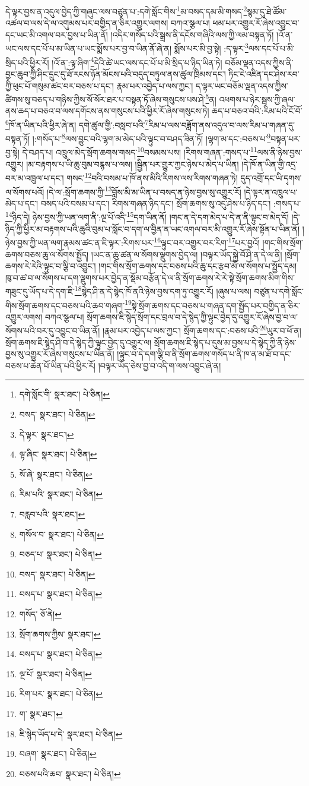 དེ་ལྟར་བྱས་ན་འདུལ་བྱེད་ཀྱི་གཞུང་ལས་བཙུན་པ་:དགེ་སློང་གིས་\footnote{དགེ་སློང་གི་  སྣར་ཐང་།  པེ་ཅིན། }མ་བསད་དམ་མི་གསད་\footnote{བསད་  སྣར་ཐང་།  པེ་ཅིན། }སྙམ་དུ་ཐེ་ཚོམ་འཚལ་བ་ལས་དེ་ལ་འགུམས་པར་བགྱིད་ན་ཅིར་འགྱུར་ལགས། བཀའ་སྩལ་པ། ཕམ་པར་འགྱུར་རོ་ཞེས་འབྱུང་བ་དང་ཡང་མི་འགལ་བར་བྱས་པ་ཡིན་ནོ། །འདིར་གསོད་པའི་སྒྲས་ནི་དངོས་གཞིའི་ལས་ཀྱི་ལམ་བསྟན་ཏོ། །འོ་ན་ཡང་ལས་དང་པོ་པ་མ་ཡིན་པ་ཡང་སྨོས་པར་བྱ་བ་ཡིན་ནོ་ཞེ་ན། སྨོས་པར་མི་བྱ་སྟེ། :ད་ལྟར་\footnote{དེ་ལྟར་  སྣར་ཐང་། }ལས་དང་པོ་པ་མི་སྲིད་པའི་ཕྱིར་རོ། །འོ་ན་:ལྟ་ཞིག་\footnote{ལྟ་ཞིང་  སྣར་ཐང་།  པེ་ཅིན། }དེའི་ཚེ་ཡང་ལས་དང་པོ་པ་མི་སྲིད་པ་ཉིད་ཡིན་ཏེ། བཅོམ་ལྡན་འདས་ཀྱིས་ནི་བྱང་ཆུབ་ཀྱི་ཤིང་དྲུང་དུ་ཐོ་རངས་ཉོན་མོངས་པའི་བདུད་བཏུལ་ནས་ཚུལ་ཁྲིམས་དང་། ཏིང་ངེ་འཛིན་དང་ཤེས་རབ་ཀྱི་ཕུང་པོ་གསུམ་ཚང་བར་བཅས་པ་དང་། རྣམ་པར་འབྱེད་པ་ལས་ཀྱང་། ད་ལྟར་ཡང་བཅོམ་ལྡན་འདས་ཀྱིས་ཚིགས་སུ་བཅད་པ་གཉིས་ཀྱིས་སོ་སོར་ཐར་པ་བསྟན་ཏོ་ཞེས་གསུངས་པས་ཤེ་\footnote{སོ་ཞེ་  སྣར་ཐང་།  པེ་ཅིན། }ན། འཕགས་པ་ཉེར་སྦས་ཀྱི་ཞལ་ནས་ཆད་པ་བཅའ་བ་ལས་དགོངས་ནས་གསུངས་པའི་ཕྱིར་རོ་ཞེས་གསུངས་ཏེ། ཆད་པ་བཅའ་བའི་:རིམ་པའི་ངོ་བོ་\footnote{རིམ་པའི་  སྣར་ཐང་།  པེ་ཅིན། }ཁོ་ན་ཡིན་པའི་ཕྱིར་ཞེ་ན། དགེ་ཚུལ་གྱི་:བསླབ་པའི་\footnote{བརླབ་པའི་  སྣར་ཐང་། }རིམ་པ་ལས་བཟློག་ནས་འདུལ་བ་ལས་རིམ་པ་གཞན་དུ་བསྟན་ཏོ། །:གསོད་པ་\footnote{གསོལ་བ་  སྣར་ཐང་།  པེ་ཅིན། }ལས་བྱུང་བའི་ལྷག་མ་མེད་པའི་ལྟུང་བ་བཤད་ཟིན་ཏོ། །ལྷག་མ་དང་:བཅས་པ་\footnote{བཅད་པ་  སྣར་ཐང་།  པེ་ཅིན། }བསྟན་པར་བྱ་སྟེ། དེ་བཤད་པ། འཁྲུལ་མེད་སྲོག་ཆགས་གསད་\footnote{བསད་  སྣར་ཐང་།  པེ་ཅིན། }བསམས་པས། །རིགས་གཞན་:གསད་པ་\footnote{བསད་པ་  སྣར་ཐང་།  པེ་ཅིན། }ལས་ནི་ཉེས་བྱས་འགྱུར། །མ་བརྟགས་པ་ཡི་ཆུ་བུམ་བརྙས་པ་ལས། །སྦྱིན་པར་གྱུར་ཀྱང་ཉེས་པ་མེད་པ་ཡིན། །དེ་ཁོ་ན་ཡིན་གྱི་འདྲ་བར་མ་འཁྲུལ་པ་དང་། གསང་\footnote{གསོད་  ཅོ་ནེ། }བའི་བསམ་པ་ཁོ་ནས་མིའི་རིགས་ལས་རིགས་གཞན་ཏེ། དུད་འགྲོ་དང་ཡི་དྭགས་ལ་སོགས་པའོ། །དེ་ལ་:སྲོག་ཆགས་ཀྱི་\footnote{སྲོག་ཆགས་ཀྱིས་  སྣར་ཐང་། }བློས་མི་མ་ཡིན་པ་བསད་ན་ཉེས་བྱས་སུ་འགྱུར་རོ། །དེ་ལྟར་ན་འཁྲུལ་པ་མེད་པ་དང་། བསད་པའི་བསམ་པ་དང་། རིགས་གཞན་ཉིད་དང་། སྲོག་ཆགས་སུ་འདུ་ཤེས་པ་ཉིད་དང་། :གསད་པ་\footnote{བསད་པ་  སྣར་ཐང་།  པེ་ཅིན། }ཉིད་དེ། ཉེས་བྱས་ཀྱི་ཡན་ལག་ནི་:ལྔ་པོ་འདི་\footnote{ལྔ་པོ་  སྣར་ཐང་།  པེ་ཅིན། }དག་ཡིན་ནོ། །གང་ན་དེ་དག་མེད་པ་དེ་ན་ནི་ལྟུང་བ་མེད་དོ། །དེ་ཉིད་ཀྱི་ཕྱིར་མ་བརྟགས་པའི་ཆུའི་བུམ་པ་སློང་བ་དག་ལ་བྱིན་ན་ཡང་འགལ་བར་མི་འགྱུར་རོ་ཞེས་སྟོན་པ་ཡིན་ནོ། །ཉེས་བྱས་ཀྱི་ཡན་ལག་རྣམས་ཚང་ན་ཇི་ལྟར་:རིགས་པར་\footnote{རིག་པར་  སྣར་ཐང་།  པེ་ཅིན། }ལྟུང་བར་འགྱུར་བར་རིག་\footnote{ག་  སྣར་ཐང་། }པར་བྱའོ། །གང་གིས་སྲོག་ཆགས་བཅས་ཆུ་ལ་སོགས་སྤྱོད། །ཡང་ན་ཆུ་ཚན་ལ་སོགས་ལྡུགས་བྱེད་ལ། །བལྟར་ཡོད་སྐྱེ་བོ་ཤི་ན་དེ་ལ་ནི། །སྲོག་ཆགས་རེ་རེའི་ལྟུང་བ་ལྕི་བ་འབྱུང་། །གང་གིས་སྲོག་ཆགས་དང་བཅས་པའི་ཆུ་དང་རྩབ་མོ་ལ་སོགས་པ་སྤྱོད་དམ། ཁུ་བ་ཚ་བ་ལ་སོགས་པ་དག་ལྡུགས་པར་བྱེད་ན་སྡོམ་བརྩོན་དེ་ལ་ནི་སྲོག་ཆགས་རེ་རེ་སྟེ་སྲོག་ཆགས་མིག་གིས་གཟུང་དུ་ཡོད་པ་དེ་དག་ཇི་\footnote{ཇི་སྙེད་ཡོད་པ་དེ་  སྣར་ཐང་།  པེ་ཅིན། }སྙེད་ཤི་ན་དེ་སྙེད་ཁོ་ནའི་ཉེས་བྱས་དག་ཏུ་འགྱུར་རོ། །ཞུས་པ་ལས། བཙུན་པ་དགེ་སློང་གིས་སྲོག་ཆགས་དང་བཅས་པའི་ཆབ་གཞག་\footnote{བཞག་  སྣར་ཐང་།  པེ་ཅིན། }སྟེ་སྲོག་ཆགས་དང་བཅས་པ་གཞན་དག་སྤྱོད་པར་བགྱིད་ན་ཅིར་འགྱུར་ལགས། བཀའ་སྩལ་པ། སྲོག་ཆགས་ཇི་སྙེད་སྲོག་དང་བྲལ་བ་དེ་སྙེད་ཀྱི་ལྟུང་བྱེད་དུ་འགྱུར་རོ་ཞེས་བྱ་བ་ལ་སོགས་པའི་བར་དུ་འབྱུང་བ་ཡིན་ནོ། །རྣམ་པར་འབྱེད་པ་ལས་ཀྱང་། སྲོག་ཆགས་དང་:བཅས་པའི་\footnote{བཅས་པའི་ཆབ་  སྣར་ཐང་།  པེ་ཅིན། }ཡུར་བ་ཕོ་ན། སྲོག་ཆགས་ཇི་སྙེད་ཤི་བ་དེ་སྙེད་ཀྱི་ལྟུང་བྱེད་དུ་འགྱུར་ལ། སྲོག་ཆགས་ཇི་སྙེད་པ་དུས་མ་བྱས་པ་དེ་སྙེད་ཀྱི་ནི་ཉེས་བྱས་སུ་འགྱུར་རོ་ཞེས་གསུངས་པ་ཡིན་ནོ། །ལྟུང་བ་དེ་དག་ལྕི་བ་ནི་སྲོག་ཆགས་གསོད་པ་ནི་ཁ་ན་མ་ཐོ་བ་དང་བཅས་པ་ཆེན་པོ་ཡིན་པའི་ཕྱིར་རོ། །བལྟར་ཡོད་ཅེས་བྱ་བ་འདི་ག་ལས་འབྱུང་ཞེ་ན། 
